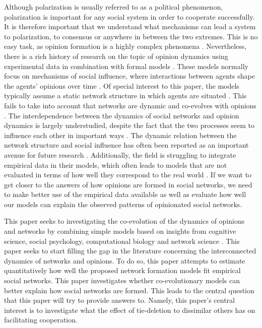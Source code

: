 \documentclass{article}
\begin{document}
Although polarization is usually referred to as a political phenomenon, polarization is important for any social system in order to cooperate successfully. It is therefore important that we understand what mechanisms can lead a system to polarization, to consensus or anywhere in between the two extremes. This is no easy task, as opinion formation is a highly complex phenomena \cite{baumann_modeling_2021}. Nevertheless, there is a rich history of research on the topic of opinion dynamics using experimental data in combination with formal models \cite{baumann_modeling_2021,chacoma_opinion_2015,flache_models_2017,friedkin_social_1990,noorazar_classical_2020,spears_social_2021,turner_paths_2018}. These models normally focus on mechanisms of social influence, where interactions between agents shape the agents’ opinions over time \cite{flache_models_2017}. Of special interest to this paper, the models typically assume a static network structure in which agents are situated \cite{galesic_integrating_2021}. This fails to take into account that networks are dynamic and co-evolves with opinions \cite{ferraz_de_arruda_modelling_2022,galesic_integrating_2021}. The interdependence between the dynamics of social networks and opinion dynamics is largely understudied, despite the fact that the two processes seem to influence each other in important ways \cite{asikainen_cumulative_2020,bruch_agent-based_2015,galesic_integrating_2021,kossinets_origins_2009,noorazar_classical_2020}. The dynamic relation between the network structure and social influence has often been reported as an important avenue for future research \cite{flache_models_2017,galesic_integrating_2021}. Additionally, the field is struggling to integrate empirical data in their models, which often leads to models that are not evaluated in terms of how well they correspond to the real world \cite{flache_models_2017,galesic_integrating_2021}. If we want to get closer to the answers of how opinions are formed in social networks, we need to make better use of the empirical data available as well as evaluate how well our models can explain the observed patterns of opinionated social networks. 

This paper seeks to investigating the co-evolution of the dynamics of opinions and networks by combining simple models based on insights from cognitive science, social psychology, computational biology and network science \cite{asikainen_cumulative_2020,flache_models_2017,ilany_social_2016,jackson_meeting_2007,santos_cooperation_2006}. This paper seeks to start filling the gap in the literature concerning the interconnected dynamics of networks and opinions. To do so, this paper attempts to estimate quantitatively how well the proposed network formation models fit empirical social networks. This paper investigates whether co-evolutionary models can better explain how social networks are formed. This leads to the central question that this paper will try to provide answers to. Namely, this paper’s central interest is to investigate what the effect of tie-deletion to dissimilar others has on facilitating cooperation. 
\end{document}
